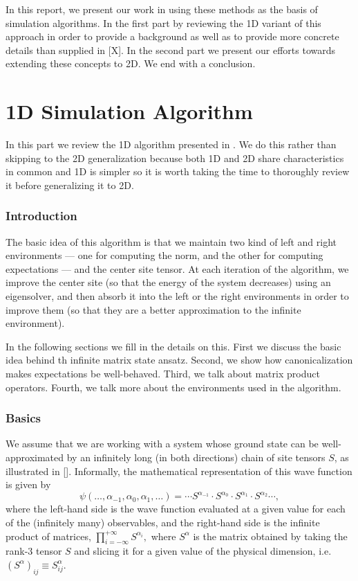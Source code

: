 \documentclass{article}
\begin{document}
In this report, we present our work in using these methods as the basis of simulation algorithms.  In the first part by reviewing the 1D variant of this approach in order to provide a background as well as to provide more concrete details than supplied in [X].  In the second part we present our efforts towards extending these concepts to 2D.  We end with a conclusion.

\part{1D Simulation Algorithm}
\label{1dsim}

In this part we review the 1D algorithm presented in \cite{Crosswhite2008}.  We do this rather than skipping to the 2D generalization because both 1D and 2D share characteristics in common and 1D is simpler so it is worth taking the time to thoroughly review it before generalizing it to 2D.

\section{Introduction}

The basic idea of this algorithm is that we maintain two kind of left and right environments --- one for computing the norm, and the other for computing expectations --- and the center site tensor.  At each iteration of the algorithm, we improve the center site (so that the energy of the system decreases) using an eigensolver, and then absorb it into the left or the right environments in order to improve them (so that they are a better approximation to the infinite environment).

In the following sections we fill in the details on this.  First we discuss the basic idea behind th infinite matrix state ansatz.  Second, we show how canonicalization makes expectations be well-behaved.  Third, we talk about matrix product operators.  Fourth, we talk more about the environments used in the algorithm.

\section{Basics}

We assume that we are working with a system whose ground state can be well-approximated by an infinitely long (in both directions) chain of site tensors $S$, as illustrated in [].  Informally, the mathematical representation of this wave function is given by
\begin{equation}
\label{bi-inf-1d-state-a}
\psi(\dots,\alpha_{-1},\alpha_{0},\alpha_1,\dots)= \cdots S^{\alpha_{-1}} \cdot S^{\alpha_0}\cdot S^{\alpha_1}\cdot S^{\alpha_2} \cdots,
\end{equation}
where the left-hand side is the wave function evaluated at a given value for each of the (infinitely many) observables, and the right-hand side is the infinite product of matrices, $\prod_{i=-\infty}^{+\infty} S^{\alpha_i},$ where $S^{\alpha}$ is the matrix obtained by taking the rank-3 tensor $S$ and slicing it for a given value of the physical dimension, i.e. $(S^\alpha)_{ij}\equiv S^\alpha_{ij}$.
\end{document}
